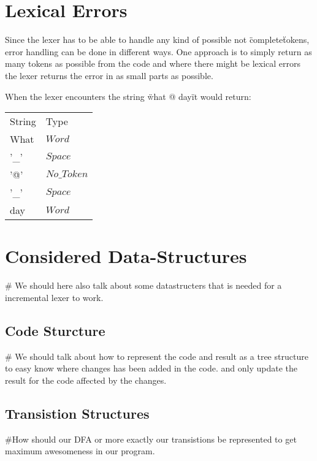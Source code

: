 \section{Lexical Errors}
Since the lexer has to be able to handle any kind of possible not \"complete\"
tokens, error handling can be done in different ways. One approach is to simply
return as many tokens as possible from the code and where there might be lexical
errors the lexer returns the error in as small parts as possible.
\begin{example} When the lexer encounters the
string \"what @ day\" it would return:
\begin{center}
\begin{tabular}{ll}
String & Type\\
What & $Word$\\
'\_' & $Space$\\
'@' & $No\_Token$\\
'\_' & $Space$\\
day & $Word$\\
\end{tabular}
\end{center}
\end{example}
\section{Considered Data-Structures}
\# We should here also talk about some datastructers that is needed for a
incremental lexer to work.
\subsection{Code Sturcture}
\# We should talk about how to represent the code and result as a tree 
structure to easy know where changes has been added in the code. and only 
update the result for the code affected by the changes. 
\subsection{Transistion Structures}
\#How should our DFA or more exactly our transistions be represented to get 
maximum awesomeness in our program.

